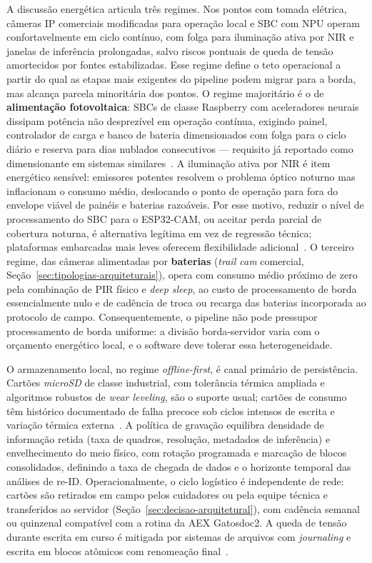 A discussão energética articula três regimes. Nos pontos com tomada elétrica, câmeras IP comerciais modificadas para operação local e SBC com NPU operam confortavelmente em ciclo contínuo, com folga para iluminação ativa por NIR e janelas de inferência prolongadas, salvo riscos pontuais de queda de tensão amortecidos por fontes estabilizadas. Esse regime define o teto operacional a partir do qual as etapas mais exigentes do pipeline podem migrar para a borda, mas alcança parcela minoritária dos pontos. O regime majoritário é o de \textbf{alimentação fotovoltaica}: SBCs de classe Raspberry com aceleradores neurais dissipam potência não desprezível em operação contínua, exigindo painel, controlador de carga e banco de bateria dimensionados com folga para o ciclo diário e reserva para dias nublados consecutivos --- requisito já reportado como dimensionante em sistemas similares~\cite{velasco2024smartcameratraps,pishdast2025smartcameratraps,sargent2021raspberrypi}. A iluminação ativa por NIR é item energético sensível: emissores potentes resolvem o problema óptico noturno mas inflacionam o consumo médio, deslocando o ponto de operação para fora do envelope viável de painéis e baterias razoáveis. Por esse motivo, reduzir o nível de processamento do SBC para o ESP32-CAM, ou aceitar perda parcial de cobertura noturna, é alternativa legítima em vez de regressão técnica; plataformas embarcadas mais leves oferecem flexibilidade adicional~\cite{tiddeman2023lowpowerhardware}. O terceiro regime, das câmeras alimentadas por \textbf{baterias} (\emph{trail cam} comercial, Seção~\ref{sec:tipologias-arquiteturais}), opera com consumo médio próximo de zero pela combinação de PIR físico e \emph{deep sleep}, ao custo de processamento de borda essencialmente nulo e de cadência de troca ou recarga das baterias incorporada ao protocolo de campo. Consequentemente, o pipeline não pode pressupor processamento de borda uniforme: a divisão borda-servidor varia com o orçamento energético local, e o software deve tolerar essa heterogeneidade.

O armazenamento local, no regime \emph{offline-first}, é canal primário de persistência. Cartões \emph{microSD} de classe industrial, com tolerância térmica ampliada e algoritmos robustos de \emph{wear leveling}, são o suporte usual; cartões de consumo têm histórico documentado de falha precoce sob ciclos intensos de escrita e variação térmica externa~\cite{tiddeman2023lowpowerhardware,sargent2021raspberrypi}. A política de gravação equilibra densidade de informação retida (taxa de quadros, resolução, metadados de inferência) e envelhecimento do meio físico, com rotação programada e marcação de blocos consolidados, definindo a taxa de chegada de dados e o horizonte temporal das análises de re-ID. Operacionalmente, o ciclo logístico é independente de rede: cartões são retirados em campo pelos cuidadores ou pela equipe técnica e transferidos ao servidor (Seção~\ref{sec:decisao-arquitetural}), com cadência semanal ou quinzenal compatível com a rotina da AEX Gatosdoc2. A queda de tensão durante escrita em curso é mitigada por sistemas de arquivos com \emph{journaling} e escrita em blocos atômicos com renomeação final~\cite{sargent2021raspberrypi}.

